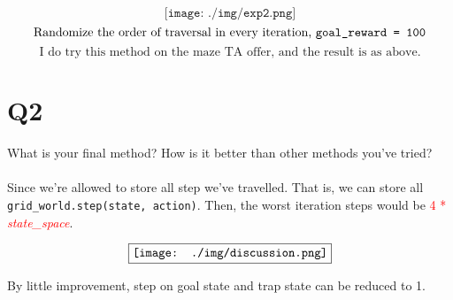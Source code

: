 \documentclass[12pt]{extarticle}
\begin{document}
\[
	\texttt{[image: ./img/exp2.png]}
\]
\[
	\text{Randomize the order of traversal in every iteration, \texttt{goal\_reward = 100}}
\]
\[
	\text{I do try this method on the maze TA offer, and the result is as above.}
\]

\newpage
\section*{Q2}
What is your final method? How is it better than other methods you've tried?\\
\\
Since we're allowed to store all step we've travelled. That is, we can store all \texttt{grid\_world.step(state, action)}. Then, the worst iteration steps would be \textcolor{red}{4 * \textit{state\_space}}.

\[
	\fbox{\texttt{[image: ./img/discussion.png]}}
\]

By little improvement, step on goal state and trap state can be reduced to 1.
\end{document}
